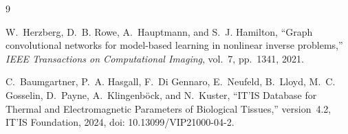 \documentclass[11pt]{article}
\begin{document}
\clearpage

\endgroup

\endgroup

\begin{thebibliography}{9}

W.~Herzberg, D.~B. Rowe, A.~Hauptmann, and S.~J. Hamilton, ``Graph convolutional networks for model-based learning in nonlinear inverse problems,'' \emph{IEEE Transactions on Computational Imaging}, vol.~7, pp.~1341, 2021.

C.~Baumgartner, P.~A. Hasgall, F.~Di Gennaro, E.~Neufeld, B.~Lloyd, M.~C. Gosselin, D.~Payne, A.~Klingenb\"ock, and N.~Kuster, ``IT'IS Database for Thermal and Electromagnetic Parameters of Biological Tissues,'' version~4.2, IT'IS Foundation, 2024, doi: 10.13099/VIP21000-04-2.

\end{thebibliography}
\end{document}
